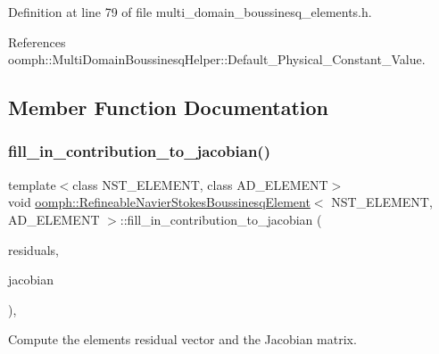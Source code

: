 Definition at line 79 of file multi\+\_\+domain\+\_\+boussinesq\+\_\+elements.\+h.



References oomph\+::\+Multi\+Domain\+Boussinesq\+Helper\+::\+Default\+\_\+\+Physical\+\_\+\+Constant\+\_\+\+Value.



\subsection{Member Function Documentation}
\mbox{\label{classoomph_1_1RefineableNavierStokesBoussinesqElement_aab6bae7d0704ab7e3e121ee594ac887a}} 
\subsubsection{\texorpdfstring{fill\+\_\+in\+\_\+contribution\+\_\+to\+\_\+jacobian()}{fill\_in\_contribution\_to\_jacobian()}}
{\footnotesize\ttfamily template$<$class N\+S\+T\+\_\+\+E\+L\+E\+M\+E\+NT, class A\+D\+\_\+\+E\+L\+E\+M\+E\+NT$>$ \\
void \hyperlink{classoomph_1_1RefineableNavierStokesBoussinesqElement}{oomph\+::\+Refineable\+Navier\+Stokes\+Boussinesq\+Element}$<$ N\+S\+T\+\_\+\+E\+L\+E\+M\+E\+NT, A\+D\+\_\+\+E\+L\+E\+M\+E\+NT $>$\+::fill\+\_\+in\+\_\+contribution\+\_\+to\+\_\+jacobian (\begin{DoxyParamCaption}\item[{\hyperlink{classoomph_1_1Vector}{Vector}$<$ double $>$ \&}]{residuals,  }\item[{\hyperlink{classoomph_1_1DenseMatrix}{Dense\+Matrix}$<$ double $>$ \&}]{jacobian }\end{DoxyParamCaption})\hspace{0.3cm}{\ttfamily [inline]}, {\ttfamily [virtual]}}



Compute the element\textquotesingle{}s residual vector and the Jacobian matrix. 



